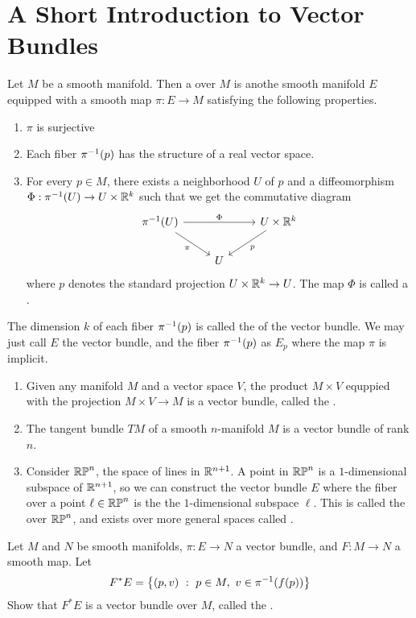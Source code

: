 \section{A Short Introduction to Vector Bundles}
%
\begin{defn}
Let $M$ be a smooth manifold. Then a  over $M$ is
anothe smooth manifold $E$ equipped with a smooth map $\pi : E \to M$
satisfying the following properties.
\begin{enumerate}
	\item $\pi$ is surjective
	\item Each fiber $\pi^{-1}(p)$ has the structure of a real vector space.
	\item For every $p \in M$, there exists a neighborhood $U$ of $p$ and
	a diffeomorphism $\Phi : \pi^{-1}(U) \to U \times \mathbb{R}^k$ such that we get
	the commutative diagram
	$$\begin{tikzcd}
	\pi\inv(U) \ar[dr, "\pi"'] \ar[rr, "\Phi"] &&
	U \times \R^k \ar[dl, "p"] \\
	& U
	\end{tikzcd}$$
	where $p$ denotes the standard projection $U \times \mathbb{R}^k \to U$. The
	map $\Phi$ is called a .
\end{enumerate}
The dimension $k$ of each fiber $\pi^{-1}(p)$ is called the  of
the vector bundle. We may just call $E$ the vector bundle, and the fiber
$\pi^{-1}(p)$ as $E_p$ where the map $\pi$ is implicit.
\end{defn}
%
\begin{exmp} \enumbreak
	\begin{enumerate}
		\item Given any manifold $M$ and a vector space $V$, the product
		$M \times V$ equppied with the projection $M \times V \to M$ is a
		vector bundle, called the .
		\item The tangent bundle $TM$ of a smooth $n$-manifold $M$ is a
		vector bundle of rank $n$.
		\item Consider $\mathbb{RP}^n$, the space of lines in $\mathbb{R}^{n+1}$. A point
		in $\mathbb{RP}^n$ is a $1$-dimensional subspace of $\mathbb{R}^{n+1}$, so we can
		construct the vector bundle $E$ where the fiber over a point
		$\ell \in \mathbb{RP}^n$ is the the $1$-dimensional subspace $\ell$.
		This is called the  over $\mathbb{RP}^n$, and
		exists over more general spaces called .
	\end{enumerate}
\end{exmp}
%
\begin{exer}
	Let $M$ and $N$ be smooth manifolds, $\pi : E \to N$ a vector bundle,
	and $F : M \to N$ a smooth map. Let
	$$F^*E = \left\lbrace (p, v) ~:~ p \in M, ~v \in \pi^{-1}(f(p)) \right\rbrace $$
	Show that $F^*E$ is a vector bundle over $M$, called the
	.
\end{exer}

